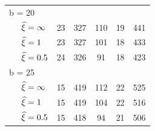 \begin{tabular}{lccccc}
\multicolumn{6}{l}{ \hspace{3.8 mm} b = 20}  \\  
 
$\hspace{.5cm} \widehat \xi = \infty$ & 23 & 327 & 110 & 19 & 441 \\
$\hspace{.5cm} \widehat \xi = 1$ & 23 & 327 & 101 & 18 & 433 \\
$\hspace{.5cm} \widehat \xi = 0.5$ & 24 & 326 & 91 & 18 & 423 \\

\multicolumn{6}{l}{ \hspace{3.8 mm} b = 25}  \\  
 
$\hspace{.5cm} \widehat \xi = \infty$ & 15 & 419 & 112 & 22 & 525 \\
$\hspace{.5cm} \widehat \xi = 1$ & 15 & 419 & 104 & 22 & 516 \\
$\hspace{.5cm} \widehat \xi = 0.5$ & 15 & 418 & 94 & 21 & 506 \\

\bottomrule
\end{tabular}
